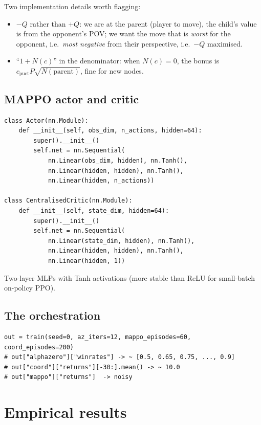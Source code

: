 \documentclass[11pt,oneside]{scrbook}
\begin{document}
Two implementation details worth flagging:
\begin{itemize}\setlength\itemsep{1pt}
  \item $-Q$ rather than $+Q$: we are at the parent (player to move), the
        child's value is from the opponent's POV; we want the move that is
        \emph{worst} for the opponent, i.e.\ \emph{most negative} from their
        perspective, i.e.\ $-Q$ maximised.
  \item ``$1 + N(c)$'' in the denominator: when $N(c) = 0$, the bonus is
        $c_{\mathrm{puct}} P \sqrt{N(\mathrm{parent})}$, fine for new nodes.
\end{itemize}

\section{MAPPO actor and critic}

\begin{verbatim}
class Actor(nn.Module):
    def __init__(self, obs_dim, n_actions, hidden=64):
        super().__init__()
        self.net = nn.Sequential(
            nn.Linear(obs_dim, hidden), nn.Tanh(),
            nn.Linear(hidden, hidden), nn.Tanh(),
            nn.Linear(hidden, n_actions))

class CentralisedCritic(nn.Module):
    def __init__(self, state_dim, hidden=64):
        super().__init__()
        self.net = nn.Sequential(
            nn.Linear(state_dim, hidden), nn.Tanh(),
            nn.Linear(hidden, hidden), nn.Tanh(),
            nn.Linear(hidden, 1))
\end{verbatim}

Two-layer MLPs with Tanh activations (more stable than ReLU for
small-batch on-policy PPO).

\section{The orchestration}

\begin{verbatim}
out = train(seed=0, az_iters=12, mappo_episodes=60, coord_episodes=200)
# out["alphazero"]["winrates"] -> ~ [0.5, 0.65, 0.75, ..., 0.9]
# out["coord"]["returns"][-30:].mean() -> ~ 10.0
# out["mappo"]["returns"]  -> noisy
\end{verbatim}

\chapter{Empirical results}
\end{document}
